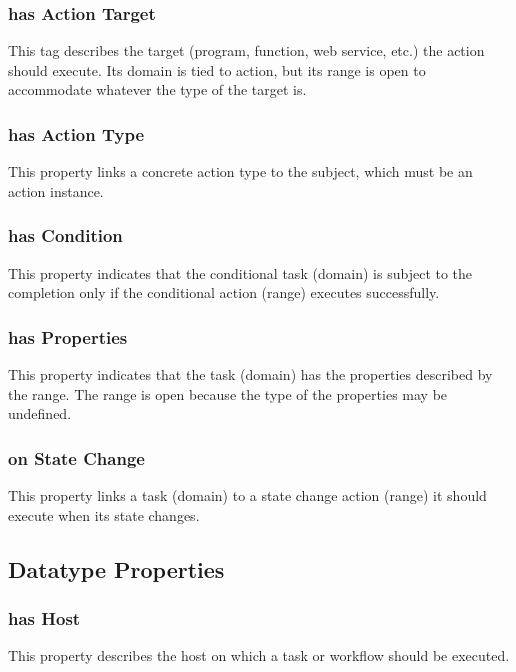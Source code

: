 \subsubsection{ has Action Target } This tag describes the target (program,
function, web service, etc.) the action should execute. Its domain is tied
to action, but its range is open to accommodate whatever the type of the target
is.
\subsubsection{ has Action Type } This property links a concrete action type to
the subject, which must be an action instance.
\subsubsection{ has Condition } This property indicates that the conditional
task (domain) is subject to the completion only if the conditional action
(range) executes successfully.
\subsubsection{ has Properties } This property indicates that the task (domain)
has the properties described by the range. The range is open because the type of
the properties may be undefined.
\subsubsection{ on State Change } This property links a task (domain) to a state
change action (range) it should execute when its state changes.
\subsection{Datatype Properties}
\subsubsection{ has Host } This property describes the host on which a task or
workflow should be executed.
